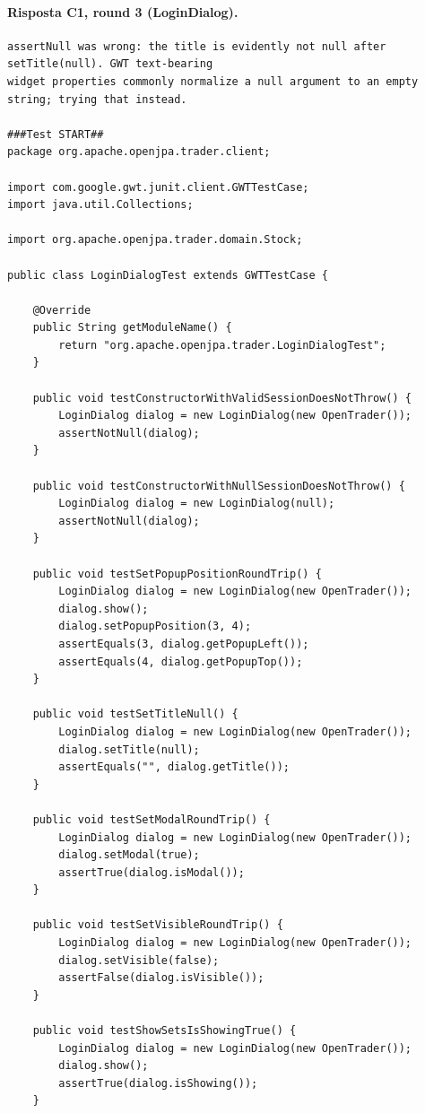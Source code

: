 \paragraph*{Risposta C1, round 3 (LoginDialog).}
\label{risposta:ld-c1-r3}
\begin{lstlisting}
assertNull was wrong: the title is evidently not null after setTitle(null). GWT text-bearing
widget properties commonly normalize a null argument to an empty string; trying that instead.

###Test START##
package org.apache.openjpa.trader.client;

import com.google.gwt.junit.client.GWTTestCase;
import java.util.Collections;

import org.apache.openjpa.trader.domain.Stock;

public class LoginDialogTest extends GWTTestCase {

    @Override
    public String getModuleName() {
        return "org.apache.openjpa.trader.LoginDialogTest";
    }

    public void testConstructorWithValidSessionDoesNotThrow() {
        LoginDialog dialog = new LoginDialog(new OpenTrader());
        assertNotNull(dialog);
    }

    public void testConstructorWithNullSessionDoesNotThrow() {
        LoginDialog dialog = new LoginDialog(null);
        assertNotNull(dialog);
    }

    public void testSetPopupPositionRoundTrip() {
        LoginDialog dialog = new LoginDialog(new OpenTrader());
        dialog.show();
        dialog.setPopupPosition(3, 4);
        assertEquals(3, dialog.getPopupLeft());
        assertEquals(4, dialog.getPopupTop());
    }

    public void testSetTitleNull() {
        LoginDialog dialog = new LoginDialog(new OpenTrader());
        dialog.setTitle(null);
        assertEquals("", dialog.getTitle());
    }

    public void testSetModalRoundTrip() {
        LoginDialog dialog = new LoginDialog(new OpenTrader());
        dialog.setModal(true);
        assertTrue(dialog.isModal());
    }

    public void testSetVisibleRoundTrip() {
        LoginDialog dialog = new LoginDialog(new OpenTrader());
        dialog.setVisible(false);
        assertFalse(dialog.isVisible());
    }

    public void testShowSetsIsShowingTrue() {
        LoginDialog dialog = new LoginDialog(new OpenTrader());
        dialog.show();
        assertTrue(dialog.isShowing());
    }


\end{lstlisting}
